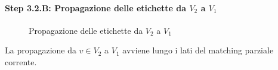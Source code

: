 \documentclass[\main/main.tex]{subfiles}
\begin{document}
\paragraph*{Step 3.2.B: Propagazione delle etichette da \(V_2\) a \(V_1\)}
\begin{figure}
	\begin{algorithm}[H]
		\SetAlgoLined
		\caption{Propagazione delle etichette da \(V_2\) a \(V_1\)}
	\end{algorithm}
\end{figure}
La propagazione da \(v \in V_2\) a \(V_1\) avviene lungo i lati del matching parziale corrente.
\end{document}
